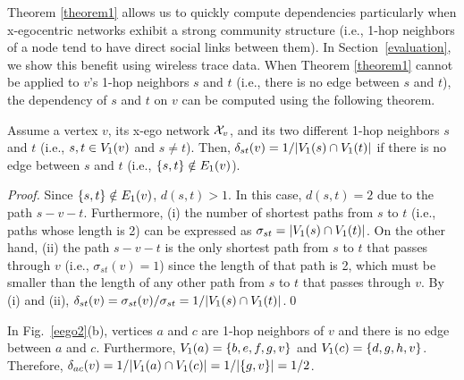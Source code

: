 % 
Theorem \ref{theorem1} allows us to quickly compute dependencies particularly when x-egocentric networks exhibit a strong community structure (i.e., 1-hop neighbors of a node tend to have direct social links between them).
In Section~\ref{evaluation}, we show this benefit using wireless trace data.
When Theorem \ref{theorem1} cannot be applied to $v$'s 1-hop neighbors $s$ and $t$ (i.e., there is no edge between $s$ and $t$), the dependency of $s$ and $t$ on $v$ can be computed using the following theorem.
\begin{theorem}
\label{theorem2} 
Assume a vertex $v$, its x-ego network $\XN{v}$, and its two different 1-hop neighbors $s$ and $t$ (i.e., $s, t \in \V{v}{1}$ and $s \ne t$).
Then, $\D{s}{t}{v} = {1}/{|\V{s}{1} \cap \V{t}{1}|}$ if there is no edge between $s$ and $t$ (i.e., $\{s, t\} \notin \E{v}{1}$).
\begin{proof}
Since $\{s, t\} \notin \E{v}{1}$, $d(s, t) > 1$.
In this case, $d(s, t) = 2$ due to the path $s - v - t$.
Furthermore, (i) the number of shortest paths from $s$ to $t$ (i.e., paths whose length is 2) can be expressed as $\sigma_{st} = |\V{s}{1} \cap \V{t}{1}|$.
On the other hand, (ii) the path $s-v-t$ is the only shortest path from $s$ to $t$ that passes through $v$ (i.e., $\sigma_{st}(v) = 1$) since the length of that path is 2, which must be smaller than the length of any other path from $s$ to $t$ that passes through $v$.
By (i) and (ii), $\D{s}{t}{v} = \sigma_{st}(v)/\sigma_{st} = {1}/{|\V{s}{1} \cap \V{t}{1}|}$.\hfill\qed
\end{proof}
\end{theorem}
\begin{example}
\label{example2} 
In Fig.~\ref{eego2}(b), vertices $a$ and $c$ are 1-hop neighbors of $v$ and there is no edge between $a$ and $c$.
Furthermore, $\V{a}{1} = \lbrace b, e, f, g, v\rbrace$ and $\V{c}{1} = \lbrace d, g, h, v\rbrace$.
Therefore, $\D{a}{c}{v}=1/|\V{a}{1} \cap \V{c}{1}|=1/|\{g, v \}|=1/2$.
\end{example}
